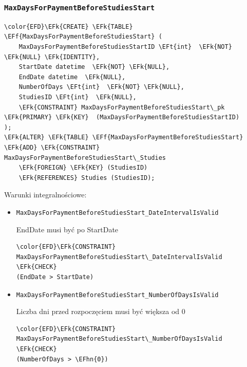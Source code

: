 \documentclass[11pt]{article}
\newcommand{\EFk}[1]{\textcolor{EFk}{\textbf{#1}}} %
\newcommand{\EFf}[1]{\textcolor{EFf}{#1}} %
\newcommand{\EFt}[1]{\textcolor{EFt}{\textbf{#1}}} %
\newcommand{\EFhn}[1]{\textcolor{EFhn}{#1}} %
\begin{document}
\subsubsection{\texttt{MaxDaysForPaymentBeforeStudiesStart}}
\label{sec:orgb090b96}
\begin{Code}
\begin{Verbatim}
\color{EFD}\EFk{CREATE} \EFk{TABLE} \EFf{MaxDaysForPaymentBeforeStudiesStart} (
    MaxDaysForPaymentBeforeStudiesStartID \EFt{int}  \EFk{NOT} \EFk{NULL} \EFk{IDENTITY},
    StartDate datetime  \EFk{NOT} \EFk{NULL},
    EndDate datetime  \EFk{NULL},
    NumberOfDays \EFt{int}  \EFk{NOT} \EFk{NULL},
    StudiesID \EFt{int}  \EFk{NULL},
    \EFk{CONSTRAINT} MaxDaysForPaymentBeforeStudiesStart\_pk \EFk{PRIMARY} \EFk{KEY}  (MaxDaysForPaymentBeforeStudiesStartID)
);
\EFk{ALTER} \EFk{TABLE} \EFf{MaxDaysForPaymentBeforeStudiesStart} \EFk{ADD} \EFk{CONSTRAINT} MaxDaysForPaymentBeforeStudiesStart\_Studies
    \EFk{FOREIGN} \EFk{KEY} (StudiesID)
    \EFk{REFERENCES} Studies (StudiesID);
\end{Verbatim}
\end{Code}
Warunki integralnościowe:


\begin{itemize}
\item \texttt{MaxDaysForPaymentBeforeStudiesStart\_DateIntervalIsValid}

EndDate musi być po StartDate
\begin{Code}
\begin{Verbatim}
\color{EFD}\EFk{CONSTRAINT} MaxDaysForPaymentBeforeStudiesStart\_DateIntervalIsValid \EFk{CHECK}
(EndDate > StartDate)
\end{Verbatim}
\end{Code}
\item \texttt{MaxDaysForPaymentBeforeStudiesStart\_NumberOfDaysIsValid}

Liczba dni przed rozpoczęciem musi być większa od 0
\begin{Code}
\begin{Verbatim}
\color{EFD}\EFk{CONSTRAINT} MaxDaysForPaymentBeforeStudiesStart\_NumberOfDaysIsValid \EFk{CHECK}
(NumberOfDays > \EFhn{0})
\end{Verbatim}
\end{Code}
\end{itemize}
\end{document}
